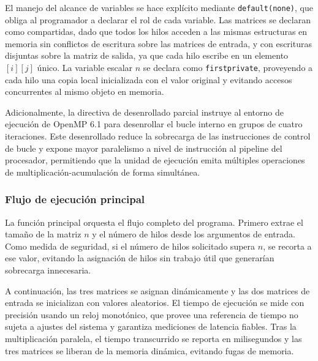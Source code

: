 El manejo del alcance de variables se hace explícito mediante \texttt{default(none)}, que obliga al programador a declarar el rol de cada variable. Las matrices se declaran como compartidas, dado que todos los hilos acceden a las mismas estructuras en memoria sin conflictos de escritura sobre las matrices de entrada, y con escrituras disjuntas sobre la matriz de salida, ya que cada hilo escribe en un elemento \([i][j]\) único. La variable escalar \(n\) se declara como \texttt{firstprivate}, proveyendo a cada hilo una copia local inicializada con el valor original y evitando accesos concurrentes al mismo objeto en memoria.

Adicionalmente, la directiva de desenrollado parcial instruye al entorno de ejecución de OpenMP 6.1 para desenrollar el bucle interno en grupos de cuatro iteraciones. Este desenrollado reduce la sobrecarga de las instrucciones de control de bucle y expone mayor paralelismo a nivel de instrucción al pipeline del procesador, permitiendo que la unidad de ejecución emita múltiples operaciones de multiplicación-acumulación de forma simultánea.

\subsubsection{Flujo de ejecución principal}

La función principal orquesta el flujo completo del programa. Primero extrae el tamaño de la matriz \(n\) y el número de hilos desde los argumentos de entrada. Como medida de seguridad, si el número de hilos solicitado supera \(n\), se recorta a ese valor, evitando la asignación de hilos sin trabajo útil que generarían sobrecarga innecesaria.

A continuación, las tres matrices se asignan dinámicamente y las dos matrices de entrada se inicializan con valores aleatorios. El tiempo de ejecución se mide con precisión usando un reloj monotónico, que provee una referencia de tiempo no sujeta a ajustes del sistema y garantiza mediciones de latencia fiables. Tras la multiplicación paralela, el tiempo transcurrido se reporta en milisegundos y las tres matrices se liberan de la memoria dinámica, evitando fugas de memoria.